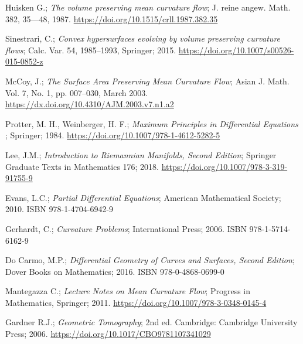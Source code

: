 \documentclass[a4paper, 12pt]{book}
\begin{document}
\begin{thebibliography}{11}
	 Huisken G.; {\em The volume preserving mean curvature flow}; J.  reine  angew.  Math.  382,  35—48, 1987. \href{https://doi.org/10.1515/crll.1987.382.35}{https://doi.org/10.1515/crll.1987.382.35}
	
	 Sinestrari, C.; {\em Convex hypersurfaces evolving by volume preserving curvature flows};  Calc. Var. 54, 1985–1993, Springer; 2015. \href{https://doi.org/10.1007/s00526-015-0852-z}{https://doi.org/10.1007/s00526-015-0852-z}
	
	 McCoy, J.; {\em The Surface Area Preserving Mean Curvature Flow}; Asian J. Math. Vol. 7, No. 1, pp. 007–030, March 2003. \href{https://dx.doi.org/10.4310/AJM.2003.v7.n1.a2}{https://dx.doi.org/10.4310/AJM.2003.v7.n1.a2}
	
	
	  Protter, M. H.,  Weinberger, H. F.; {\em Maximum Principles in Differential Equations };  Springer; 1984. \href{https://doi.org/10.1007/978-1-4612-5282-5}{https://doi.org/10.1007/978-1-4612-5282-5}
	
	
	 Lee, J.M.; {\em Introduction to Riemannian Manifolds, Second Edition};  Springer Graduate Texts in Mathematics 176; 2018. \href{https://doi.org/10.1007/978-3-319-91755-9}{https://doi.org/10.1007/978-3-319-91755-9}
	
	
	 Evans, L.C.; {\em Partial Differential Equations};  American Mathematical Society; 2010. ISBN 978-1-4704-6942-9
	
	 Gerhardt, C.; {\em Curvature Problems}; International Press; 2006. ISBN 978-1-5714-6162-9
	
	 Do Carmo, M.P.; {\em Differential Geometry of Curves and Surfaces, Second Edition};  Dover Books on Mathematics; 2016. ISBN 978-0-4868-0699-0
	
	
	 Mantegazza C.; {\em Lecture Notes on Mean Curvature Flow}; Progress in Mathematics, Springer; 2011. \href{https://doi.org/10.1007/978-3-0348-0145-4}{https://doi.org/10.1007/978-3-0348-0145-4}
	
	
	 Gardner R.J.; {\em Geometric Tomography}; 2nd ed. Cambridge: Cambridge University Press; 2006. \href{https://doi.org/10.1017/CBO9781107341029}{https://doi.org/10.1017/CBO9781107341029}
	
	
\end{thebibliography}
%
\end{document}
